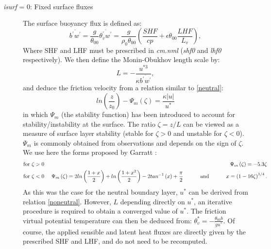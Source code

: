 \documentclass[12pt,A4,french]{article}
\begin{document}
\begin{description}
\item[{\it isurf} = 0: Fixed surface fluxes]
The surface buoyancy flux is defined as:
\begin{equation}
\overline{b^{\prime}w^{\prime}} = \frac{g}{\theta_{00}}\overline{\theta_{v}^{\prime}w^{\prime}} = \frac{g}{\rho_0 \theta_{00}}\left(\frac{SHF}{cp} + \epsilon \theta_{00}\frac{LHF}{L_{v}}\right),
\end{equation}
Where SHF and LHF must be prescribed in {\it cm.nml} ({\it shf0} and {\it lhf0} respectively). We then define the Monin-Obukhov length scale by:
\begin{equation}
L = - \frac{u^{*3}}{\kappa \overline{b^{\prime}w^{\prime}}},
\end{equation}
and deduce the friction velocity from a relation similar to \ref{neutral}:
\begin{equation}
ln\left(\frac{z}{z_{0}}\right) - \Psi_{m}\left(\zeta\right) = \frac{\kappa \left| u \right|}{u^{*}}
\label{noneutral}
\end{equation}
in which $\Psi_{m}$ (the stability function) has been introduced to account for stability/instability at the surface.
The ratio $\zeta = z/L$ can be viewed as a measure of surface layer stability (stable for $\zeta>0$ and unstable for $\zeta<0$). $\Psi_{m}$ is commonly obtained 
from observations and depends on the sign of $\zeta$. We use here the forms proposed by Garratt \cite{Gar1992}:
\begin{eqnarray}
\mbox{for } \zeta > 0 & \mbox{      } & \Psi_{m}\left(\zeta\right) = -5.3 \zeta \\
\mbox{for } \zeta < 0 & \mbox{      } & \Psi_{m}\left(\zeta\right) = 2 ln\left(\frac{1+x}{2}\right) + ln\left(\frac{1+x^{2}}{2}\right) - 2 tan^{-1}\left(x\right) +
\frac{\pi}{2} \mbox{\hspace{1cm} and \hspace{1cm}} x = \left(1 - 16\zeta\right)^{1/4}.
\end{eqnarray}
As this was the case for the neutral boundary layer, $u^{*}$ can be derived from relation \ref{noneutral}. However, $L$ depending directly on $u^{*}$, an iterative
procedure is required to obtain a converged value of $u^{*}$. The friction virtual potential temperature can then be deduced from: $\theta^{*}_{v} = - \frac{\theta_{00} b}{g u^{*}}$. Of course, the applied sensible and latent heat fluxes are directly given by the prescribed SHF and LHF, and do not need to be recomputed.


\end{description}
\end{document}

